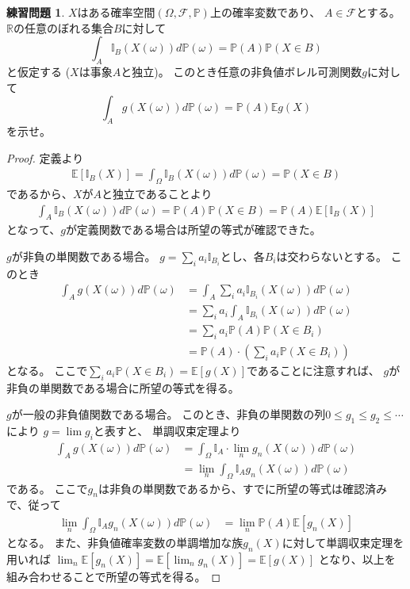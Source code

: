\documentclass[uplatex]{jsarticle}
\theoremstyle{definition}
\newtheorem{prob}[prob]{練習問題}
\def\R{\mathbb{R}}
\def\P{\mathbb{P}}
\def\E{\mathbb{E}}
\def\I{\mathbb{I}}
\def\mcF{\mathcal{F}}
\begin{document}
\begin{prob}\label{prob: 1.9}
  \(X\)はある確率空間\((\Omega,\mcF,\P)\)上の確率変数であり、
  \(A\in \mcF\)とする。
  \(\R\)の任意のぼれる集合\(B\)に対して
  \[
  \int_A\I_B(X(\omega))d\P(\omega) = \P(A)\P(X\in B)
  \]
  と仮定する (\(X\)は事象\(A\)と独立)。
  このとき任意の非負値ボレル可測関数\(g\)に対して
  \[
  \int_Ag(X(\omega))d\P(\omega) = \P(A)\E g(X)
  \]
  を示せ。
\end{prob}

\begin{proof}
  定義より
  \begin{align*}
    \E [\I_B(X)] = \int_{\Omega}\I_B(X(\omega))d\P(\omega) = \P(X\in B)
  \end{align*}
  であるから、\(X\)が\(A\)と独立であることより
  \begin{align*}
    \int_A\I_B(X(\omega))d\P(\omega) = \P(A)\P(X\in B) = \P(A)\E[\I_B(X)]
  \end{align*}
  となって、\(g\)が定義関数である場合は所望の等式が確認できた。

  \(g\)が非負の単関数である場合。
  \(g = \sum _i a_i\I_{B_i}\)とし、各\(B_i\)は交わらないとする。
  このとき
  \begin{align*}
    \int_Ag(X(\omega))d\P(\omega)
    &= \int_A\sum _i a_i\I_{B_i}(X(\omega))d\P(\omega) \\
    &= \sum_i a_i \int_A \I_{B_i}(X(\omega))d\P(\omega) \\
    &= \sum_i a_i \P(A)\P(X\in B_i)  \\
    &= \P(A)\cdot \left( \sum_i a_i \P(X\in B_i)\right)
  \end{align*}
  となる。
  ここで\(\sum_i a_i \P(X\in B_i) = \E[g(X)]\)であることに注意すれば、
  \(g\)が非負の単関数である場合に所望の等式を得る。

  \(g\)が一般の非負値関数である場合。
  このとき、非負の単関数の列\(0\leq g_1\leq g_2\leq \cdots\)により
  \(g = \lim g_i\)と表すと、
  単調収束定理より
  \begin{align*}
    \int_Ag(X(\omega))d\P(\omega)
    &= \int_{\Omega}\I_A \cdot \lim _n g_n(X(\omega))d\P(\omega) \\
    &= \lim _n\int_{\Omega}\I_Ag_n(X(\omega))d\P(\omega)
  \end{align*}
  である。
  ここで\(g_n\)は非負の単関数であるから、すでに所望の等式は確認済みで、従って
  \begin{align*}
    \lim _n\int_{\Omega}\I_Ag_n(X(\omega))d\P(\omega)
    &= \lim_n \P(A)\E[g_n(X)]
  \end{align*}
  となる。
  また、非負値確率変数の単調増加な族\(g_n(X)\)に対して単調収束定理を用いれば
  \(\lim_n\E[g_n(X)] = \E[\lim_n g_n(X)] = \E[g(X)]\)
  となり、以上を組み合わせることで所望の等式を得る。
\end{proof}
\end{document}
